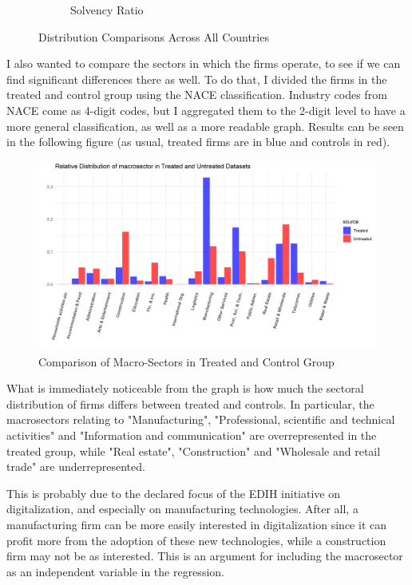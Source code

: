 \documentclass[12pt]{report}
\begin{document}
\begin{figure}[ht]
\begin{subfigure}[b]{0.45\textwidth}
        \caption{Solvency Ratio}
        \label{fig:solvency_ratio}
    \end{subfigure}
    \caption{Distribution Comparisons Across All Countries}
    \label{fig:distribution_comparisons_lotsofvasrs}
\end{figure}

\par I also wanted to compare the sectors in which the firms operate, to see if we can find significant differences there as well. To do that, I divided the firms in the treated and control group using the NACE classification. Industry codes from NACE come as 4-digit codes, but I aggregated them to the 2-digit level to have a more general classification, as well as a more readable graph. Results can be seen in the following figure (as usual, treated firms are in blue and controls in red).

\begin{figure}[h!]
    \centering
    \includegraphics[width=\linewidth]{../Output/macrosectorsplot_compared.png}
    \caption{Comparison of Macro-Sectors in Treated and Control Group}
    \label{fig:distrib_compare_macrosectors_allcountries}
\end{figure}

\par What is immediately noticeable from the graph is how much the sectoral distribution of firms differs between treated and controls. In particular, the macrosectors relating to "Manufacturing", "Professional, scientific and technical activities" and "Information and communication" are overrepresented in the treated group, while "Real estate", "Construction" and "Wholesale and retail trade" are underrepresented.
\par This is probably due to the declared focus of the EDIH initiative on digitalization, and especially on manufacturing technologies. After all, a manufacturing firm can be more easily interested in digitalization since it can profit more from the adoption of these new technologies, while a construction firm may not be as interested. This is an argument for including the macrosector as an independent variable in the regression.
\end{document}
